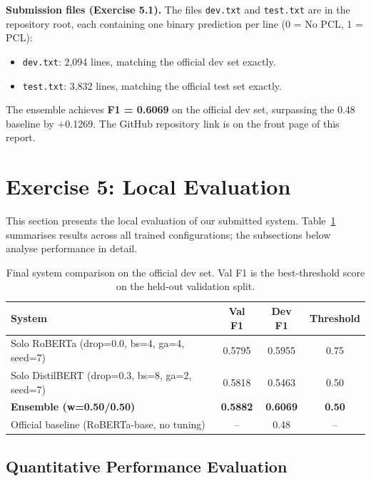 \documentclass[11pt]{article}
\begin{document}
\textbf{Submission files (Exercise 5.1).} The files \texttt{dev.txt} and \texttt{test.txt} are in the repository root, each containing one binary prediction per line (0 = No PCL, 1 = PCL):

\begin{itemize}[noitemsep]
    \item \texttt{dev.txt}: 2,094 lines, matching the official dev set exactly.
    \item \texttt{test.txt}: 3,832 lines, matching the official test set exactly.
\end{itemize}

The ensemble achieves \textbf{F1 = 0.6069} on the official dev set, surpassing the 0.48 baseline by $+$0.1269. The GitHub repository link is on the front page of this report.

\clearpage
\section{Exercise 5: Local Evaluation}
\label{sec:local}

This section presents the local evaluation of our submitted system. Table~\ref{tab:final_results} summarises results across all trained configurations; the subsections below analyse performance in detail.

\begin{table}[H]
\centering
\begin{tabular}{lccc}
\toprule
System & Val F1 & Dev F1 & Threshold \\
\midrule
Solo RoBERTa (drop=0.0, bs=4, ga=4, seed=7)       & 0.5795 & 0.5955 & 0.75 \\
Solo DistilBERT (drop=0.3, bs=8, ga=2, seed=7)     & 0.5818 & 0.5463 & 0.50 \\
\textbf{Ensemble (w=0.50/0.50)}                    & \textbf{0.5882} & \textbf{0.6069} & \textbf{0.50} \\
Official baseline (RoBERTa-base, no tuning)        & -- & 0.48 & -- \\
\bottomrule
\end{tabular}
\caption{Final system comparison on the official dev set. Val F1 is the best-threshold score on the held-out validation split.}
\label{tab:final_results}
\end{table}

\subsection{Quantitative Performance Evaluation}
\end{document}
